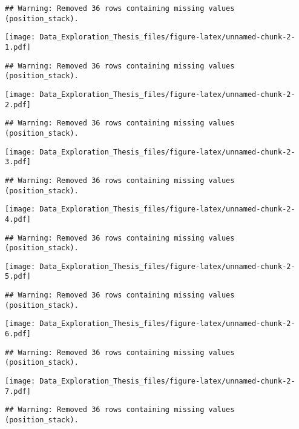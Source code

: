 \documentclass[]{article}
\begin{document}
\begin{verbatim}
## Warning: Removed 36 rows containing missing values (position_stack).
\end{verbatim}

\texttt{[image: Data\_Exploration\_Thesis\_files/figure-latex/unnamed-chunk-2-1.pdf]}

\begin{verbatim}
## Warning: Removed 36 rows containing missing values (position_stack).
\end{verbatim}

\texttt{[image: Data\_Exploration\_Thesis\_files/figure-latex/unnamed-chunk-2-2.pdf]}

\begin{verbatim}
## Warning: Removed 36 rows containing missing values (position_stack).
\end{verbatim}

\texttt{[image: Data\_Exploration\_Thesis\_files/figure-latex/unnamed-chunk-2-3.pdf]}

\begin{verbatim}
## Warning: Removed 36 rows containing missing values (position_stack).
\end{verbatim}

\texttt{[image: Data\_Exploration\_Thesis\_files/figure-latex/unnamed-chunk-2-4.pdf]}

\begin{verbatim}
## Warning: Removed 36 rows containing missing values (position_stack).
\end{verbatim}

\texttt{[image: Data\_Exploration\_Thesis\_files/figure-latex/unnamed-chunk-2-5.pdf]}

\begin{verbatim}
## Warning: Removed 36 rows containing missing values (position_stack).
\end{verbatim}

\texttt{[image: Data\_Exploration\_Thesis\_files/figure-latex/unnamed-chunk-2-6.pdf]}

\begin{verbatim}
## Warning: Removed 36 rows containing missing values (position_stack).
\end{verbatim}

\texttt{[image: Data\_Exploration\_Thesis\_files/figure-latex/unnamed-chunk-2-7.pdf]}

\begin{verbatim}
## Warning: Removed 36 rows containing missing values (position_stack).
\end{verbatim}
\end{document}
